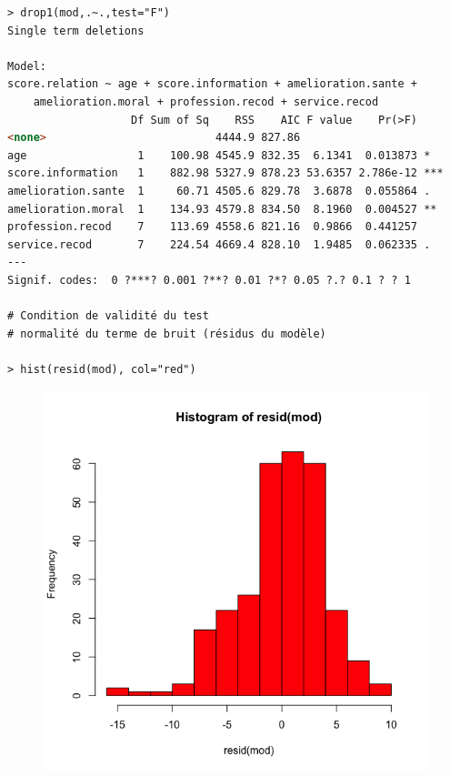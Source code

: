 \begin{lstlisting}[language=html]
> drop1(mod,.~.,test="F")
Single term deletions

Model:
score.relation ~ age + score.information + amelioration.sante + 
    amelioration.moral + profession.recod + service.recod
                   Df Sum of Sq    RSS    AIC F value    Pr(>F)    
<none>                          4444.9 827.86                      
age                 1    100.98 4545.9 832.35  6.1341  0.013873 *  
score.information   1    882.98 5327.9 878.23 53.6357 2.786e-12 ***
amelioration.sante  1     60.71 4505.6 829.78  3.6878  0.055864 .  
amelioration.moral  1    134.93 4579.8 834.50  8.1960  0.004527 ** 
profession.recod    7    113.69 4558.6 821.16  0.9866  0.441257    
service.recod       7    224.54 4669.4 828.10  1.9485  0.062335 .  
---
Signif. codes:  0 ?***? 0.001 ?**? 0.01 ?*? 0.05 ?.? 0.1 ? ? 1

# Condition de validité du test
# normalité du terme de bruit (résidus du modèle)

> hist(resid(mod), col="red")
\end{lstlisting}

\begin{figure}[H]\begin{center}\includegraphics[scale=0.5]{ilu/Dev31.png}\end{center}\end{figure}

